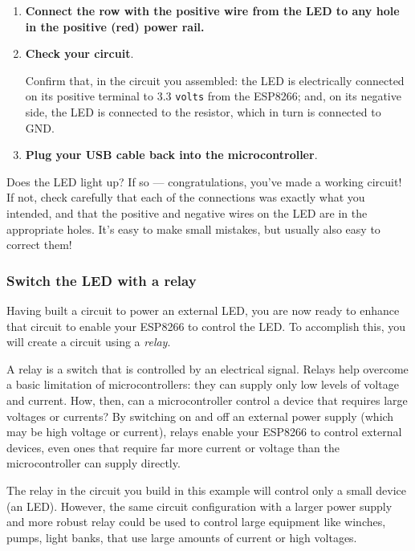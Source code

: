 \begin{enumerate}
	\item \textbf{Connect the row with the positive wire from the LED to any hole in the positive (red) power rail.}
	
	\item \textbf{Check your circuit}.
	
	Confirm that, in the circuit you assembled: the LED is electrically connected on its positive terminal to 3.3 \texttt{volts} from the ESP8266; and, on its negative side, the LED is connected to the resistor, which in turn is connected to GND.
	
	\item \textbf{Plug your USB cable back into the microcontroller}.
\end{enumerate}
Does the LED light up? If so --- congratulations, you’ve made a working circuit! 
If not, check carefully that each of the connections was exactly what you intended, and that the positive and negative wires on the LED are in the appropriate holes. 
It’s easy to make small mistakes, but usually also easy to correct them!


\subsubsection{\howto Switch the LED with a relay}

Having built a circuit to power an external LED, you are now ready to enhance that circuit to enable your ESP8266 to control the LED.
To accomplish this, you will create a circuit using a \emph{relay}.

A relay is a switch that is controlled by an electrical signal. 
Relays help overcome a basic limitation of microcontrollers: they can supply only low levels of voltage and current. 
How, then, can a microcontroller control a device that requires large voltages or currents?
By switching on and off an external power supply (which may be high voltage or current), relays enable your ESP8266 to control external devices, even ones that require far more current or voltage than the microcontroller can supply directly.

The relay in the circuit you build in this example will control only a small device (an LED).
However, the same circuit configuration with a larger power supply and more robust relay could be used to control large equipment like winches, pumps, light banks, \etc that use large amounts of current or high voltages. 


